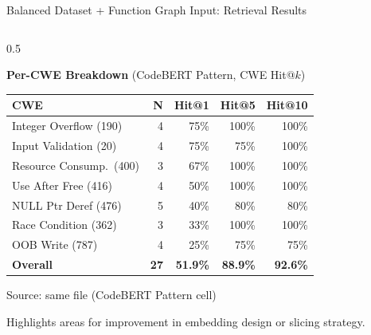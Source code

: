 \documentclass[aspectratio=169,10pt]{beamer}
\newcommand{\chit}[1]{\cellcolor{hit!30} #1}
\newcommand{\cmiss}[1]{\cellcolor{miss!25} #1}
\newcommand{\cwarn}[1]{\cellcolor{warn!30} #1}
\begin{document}
\begin{frame}{Balanced Dataset + Function Graph Input: Retrieval Results}
\begin{columns}[T]
\begin{column}{0.5\textwidth}
  \begin{center}
  {\small\textbf{Per-CWE Breakdown} {\scriptsize(CodeBERT Pattern, CWE Hit@$k$)}}\\[6pt]
  {\scriptsize
  \renewcommand{\arraystretch}{1.35}
  \setlength{\tabcolsep}{3.5pt}
  \begin{tabular}{l r rrr}
    \toprule
    \textbf{CWE} & \textbf{N} & \textbf{Hit@1} & \textbf{Hit@5} & \textbf{Hit@10} \\
    \midrule
    Integer Overflow (190) & 4 & \chit{75\%} & 100\% & 100\% \\
    Input Validation (20) & 4 & \chit{75\%} & 75\% & 100\% \\
    Resource Consump.\ (400) & 3 & \chit{67\%} & 100\% & 100\% \\
    Use After Free (416) & 4 & 50\% & 100\% & 100\% \\
    NULL Ptr Deref (476) & 5 & \cwarn{40\%} & 80\% & 80\% \\
    Race Condition (362) & 3 & \cwarn{33\%} & 100\% & 100\% \\
    OOB Write (787) & 4 & \cmiss{25\%} & 75\% & 75\% \\
    \midrule
    \textbf{Overall} & \textbf{27} & \textbf{51.9\%} & \textbf{88.9\%} & \textbf{92.6\%} \\
    \bottomrule
  \end{tabular}}

  \vspace{0.2em}
  {\tiny\textcolor{notecol}{Source: same file (CodeBERT Pattern cell)}}

  \vspace{0.2em}
  {\scriptsize\textcolor{notecol}{Highlights areas for improvement in embedding design or slicing strategy.}}
  \end{center}
    \end{column}
  \end{columns}
\end{frame}



\end{document}
